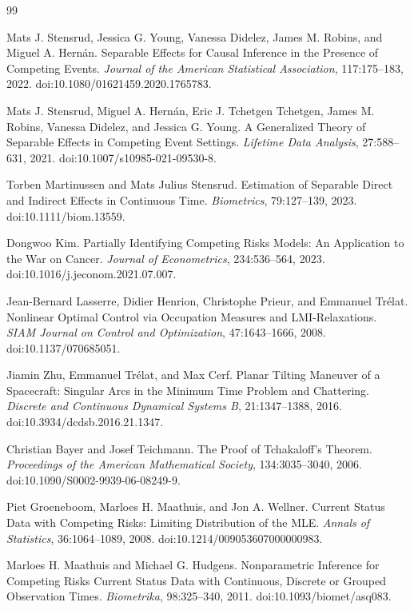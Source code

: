\documentclass{article}
\begin{document}
\begin{thebibliography}{99}

   Mats J. Stensrud, Jessica G. Young, Vanessa Didelez, James M. Robins, and Miguel A. Hernán. Separable Effects for Causal Inference in the Presence of Competing Events. \emph{Journal of the American Statistical Association}, 117:175--183, 2022. doi:10.1080/01621459.2020.1765783.

   Mats J. Stensrud, Miguel A. Hernán, Eric J. Tchetgen Tchetgen, James M. Robins, Vanessa Didelez, and Jessica G. Young. A Generalized Theory of Separable Effects in Competing Event Settings. \emph{Lifetime Data Analysis}, 27:588--631, 2021. doi:10.1007/s10985-021-09530-8.

   Torben Martinussen and Mats Julius Stensrud. Estimation of Separable Direct and Indirect Effects in Continuous Time. \emph{Biometrics}, 79:127--139, 2023. doi:10.1111/biom.13559.

   Dongwoo Kim. Partially Identifying Competing Risks Models: An Application to the War on Cancer. \emph{Journal of Econometrics}, 234:536--564, 2023. doi:10.1016/j.jeconom.2021.07.007.

   Jean-Bernard Lasserre, Didier Henrion, Christophe Prieur, and Emmanuel Trélat. Nonlinear Optimal Control via Occupation Measures and LMI-Relaxations. \emph{SIAM Journal on Control and Optimization}, 47:1643--1666, 2008. doi:10.1137/070685051.

   Jiamin Zhu, Emmanuel Trélat, and Max Cerf. Planar Tilting Maneuver of a Spacecraft: Singular Arcs in the Minimum Time Problem and Chattering. \emph{Discrete and Continuous Dynamical Systems B}, 21:1347--1388, 2016. doi:10.3934/dcdsb.2016.21.1347.

   Christian Bayer and Josef Teichmann. The Proof of Tchakaloff's Theorem. \emph{Proceedings of the American Mathematical Society}, 134:3035--3040, 2006. doi:10.1090/S0002-9939-06-08249-9.

   Piet Groeneboom, Marloes H. Maathuis, and Jon A. Wellner. Current Status Data with Competing Risks: Limiting Distribution of the MLE. \emph{Annals of Statistics}, 36:1064--1089, 2008. doi:10.1214/009053607000000983.

   Marloes H. Maathuis and Michael G. Hudgens. Nonparametric Inference for Competing Risks Current Status Data with Continuous, Discrete or Grouped Observation Times. \emph{Biometrika}, 98:325--340, 2011. doi:10.1093/biomet/asq083.


\end{thebibliography}
\end{document}
